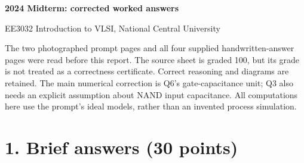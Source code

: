 \documentclass[10pt]{article}
\begin{document}
\begin{center}{\Large\bfseries 2024 Midterm: corrected worked answers}\par EE3032 Introduction to VLSI, National Central University\end{center}
The two photographed prompt pages and all four supplied handwritten-answer pages were read before this report. The source sheet is graded 100, but its grade is not treated as a correctness certificate. Correct reasoning and diagrams are retained. The main numerical correction is Q6's gate-capacitance unit; Q3 also needs an explicit assumption about NAND input capacitance. All computations here use the prompt's ideal models, rather than an invented process simulation.

\section*{1. Brief answers (30 points)}
\end{document}
